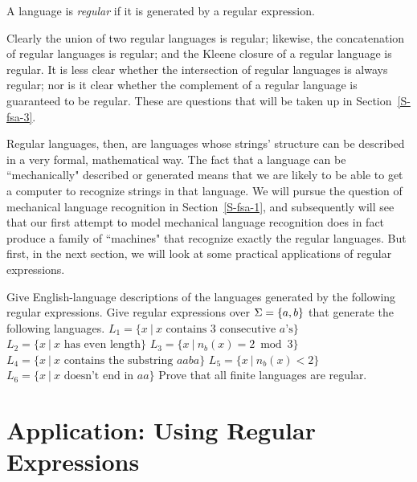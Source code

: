 \begin{definition}
A language is {\em regular} if it is generated by
a regular expression.
\end{definition}

Clearly the union of two regular languages is regular; likewise, 
the concatenation of regular languages is regular; and the Kleene
closure of a regular language is regular. It is less clear whether the
intersection of regular languages is always regular; nor is it clear whether the
complement of a regular language is guaranteed to be regular.  These are
questions that will be taken up in Section~\ref{S-fsa-3}.

Regular languages, then, are languages whose strings' structure can be described
in a very formal, mathematical way.  The fact that a language can be
``mechanically" described or generated means that we are likely to be
able to get a computer to recognize strings in that language.
We will pursue the question of mechanical language recognition in
Section~\ref{S-fsa-1}, and subsequently will see that our first attempt to model mechanical
language recognition does in fact produce a family of ``machines" that recognize
exactly the regular languages.  But first, in the next section, we will look at some
practical applications of regular expressions.

\begin{exercises}
\problem Give English-language descriptions of the languages generated by the
following regular expressions.
\problem Give regular expressions over $\Sigma=\mbox{$\{a,b\}$}$ that generate the 
following languages.
\ppart $L_1 = \{ x \ | \ x \mbox{ contains 3 consecutive $a$'s}\}$
\ppart $L_2 = \{ x \ | \ x \mbox{ has even length}\}$
\ppart $L_3 = \{ x \ | \ n_b(x) = 2 \bmod{3}\}$
\ppart $L_4 = \{ x \ | \ x \mbox{ contains the substring } aaba\}$
\ppart $L_5 = \{ x \ | \ n_b(x) < 2 \}$
\ppart $L_6 = \{ x \ | \ x \mbox{ doesn't end in } aa\}$
\problem Prove that all finite languages are regular.

\end{exercises}


\section{Application: Using Regular Expressions}

\newcommand{\bk}{\char`\\}
\newcommand{\vb}{\char`\|}
\newcommand{\sol}{\char`\^}

